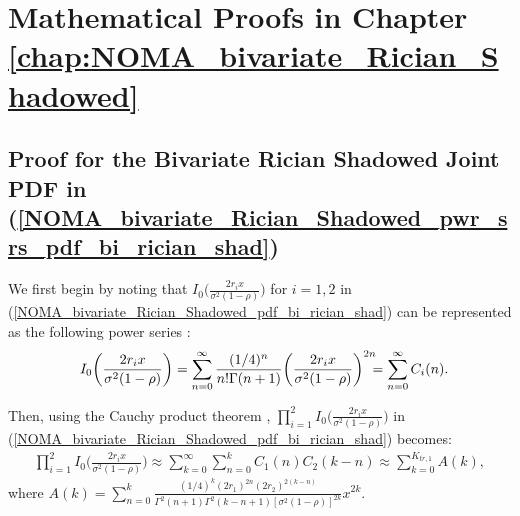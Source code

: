 \chapter{Mathematical Proofs in Chapter \ref{chap:NOMA_bivariate_Rician_Shadowed}}
\label{chap:Appendix_F}

\section{Proof for the Bivariate Rician Shadowed Joint PDF in (\ref{NOMA_bivariate_Rician_Shadowed_pwr_srs_pdf_bi_rician_shad})} \label{NOMA_bivariate_Rician_Shadowed_pdf_lemma_proof}
We first begin by noting that $I_0\big( \frac{2r_ix}{\sigma^2(1-\rho)} \big)$ for $i=1,2$ in (\ref{NOMA_bivariate_Rician_Shadowed_pdf_bi_rician_shad}) can be represented as the following power series \cite[eq. (9.6.10)]{abramowitz1964handbook}:
\begin{eqnarray} \label{NOMA_bivariate_Rician_Shadowed_mod_bessel_pwr_series}
I_0\bigg( \frac{2r_ix}{\sigma^2(1-\rho)} \bigg) = \sum_{n=0}^{\infty} \frac{(1/4)^n}{n! \Gamma(n+1)} \bigg( \frac{2r_ix}{\sigma^2 (1-\rho)} \bigg)^{2n} \hspace{-0.2cm} = \sum_{n=0}^{\infty} C_i(n). \hspace{-0.2cm}
\end{eqnarray}

Then, using the Cauchy product theorem \cite[eq. (0.316)]{gradshteyn2014table}, $\prod_{i=1}^2 I_0\big( \frac{2r_ix}{\sigma^2(1-\rho)} \big)$ in (\ref{NOMA_bivariate_Rician_Shadowed_pdf_bi_rician_shad}) becomes:
\begin{eqnarray} \label{NOMA_bivariate_Rician_Shadowed_prod_mod_bessel_pwr_series}
\prod_{i=1}^2 I_0\bigg( \frac{2r_ix}{\sigma^2(1-\rho)} \bigg) \approx \sum_{k=0}^{\infty} \sum_{n=0}^{k} C_1(n) C_2(k-n) \approx \sum_{k=0}^{K_{tr,1}} A(k),
\end{eqnarray}
where $A(k) = \sum_{n=0}^{k} \frac{(1/4)^k (2r_1)^{2n}(2r_2)^{2(k-n)}}{\Gamma^2(n+1)\Gamma^2(k-n+1)[\sigma^2 (1-\rho)]^{2k}}x^{2k}$.

